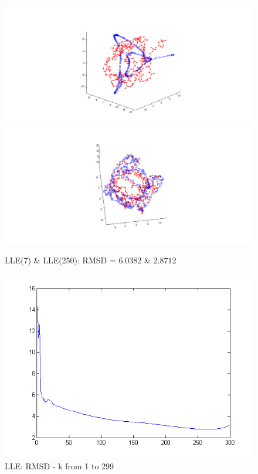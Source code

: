\documentclass[12pt]{article} %
\begin{document}
\begin{figure}[ht]\centering
	\includegraphics[scale=0.2]{fig1}
	\includegraphics[scale=0.2]{fig6}
	\caption{LLE(7) \& LLE(250): RMSD = $6.0382$ \& $2.8712$}
\end{figure}

\begin{figure}[ht]\centering
	\includegraphics[scale=0.5]{fig4}
	\caption{LLE: RMSD - k from 1 to 299}
\end{figure}
\end{document}
